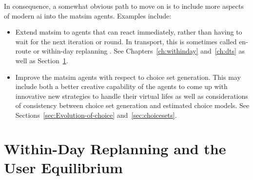 In consequence, a somewhat obvious path to move on is to include more aspects of modern \gls{ai} into the \gls{matsim} agents.  Examples include:
\begin{itemize}

\item Extend \gls{matsim} to agents that can react 
immediately, rather than having to wait for the next iteration or round.  In transport, this is sometimes called en-route or within-day replanning \citep[e.g.,][]{EmmerinkEtAl_TransResC_1995,balijepalli-2007, Axhausen_Jones_1990}. 
See Chapters~\ref{ch:withinday} and~\ref{ch:dts} as well as Section~\ref{sec:researchavenues-withinday}.

\item Improve the \gls{matsim} agents with respect to choice set generation.  This may include both a better creative capability of the agents to come up with innovative new strategies to handle their virtual lifes as well as considerations of consistency between choice set generation and estimated choice models.  See Sections~\ref{sec:Evolution-of-choice} and~\ref{sec:choicesets}.

\end{itemize}





\section{Within-Day Replanning and the User Equilibrium}
\label{sec:researchavenues-withinday}


